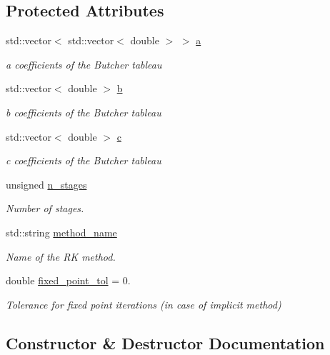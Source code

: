 \subsection*{Protected Attributes}
\begin{DoxyCompactItemize}
\item 
std\+::vector$<$ std\+::vector$<$ double $>$ $>$ \hyperlink{classRKSolver_ac5db53f1709b9db57f5ac9f41b54aa56}{a}
\begin{DoxyCompactList}\small\item\em a coefficients of the Butcher tableau \end{DoxyCompactList}\item 
std\+::vector$<$ double $>$ \hyperlink{classRKSolver_a205a66e4ac1d479de5d7e0677ae32783}{b}
\begin{DoxyCompactList}\small\item\em b coefficients of the Butcher tableau \end{DoxyCompactList}\item 
std\+::vector$<$ double $>$ \hyperlink{classRKSolver_af8ae228652ea669839fe260398057724}{c}
\begin{DoxyCompactList}\small\item\em c coefficients of the Butcher tableau \end{DoxyCompactList}\item 
unsigned \hyperlink{classRKSolver_adccead9bf0b1c26a25a073b05f25cc76}{n\+\_\+stages}
\begin{DoxyCompactList}\small\item\em Number of stages. \end{DoxyCompactList}\item 
std\+::string \hyperlink{classRKSolver_af0635d0dae01c89746b582796784794a}{method\+\_\+name}
\begin{DoxyCompactList}\small\item\em Name of the RK method. \end{DoxyCompactList}\item 
double \hyperlink{classRKSolver_aae528768265579a7c5b5cc5466114c82}{fixed\+\_\+point\+\_\+tol} = 0.
\begin{DoxyCompactList}\small\item\em Tolerance for fixed point iterations (in case of implicit method) \end{DoxyCompactList}\end{DoxyCompactItemize}


\subsection{Constructor \& Destructor Documentation}
\mbox{\label{classRKSolver_a47393b170acf8f25fb5110448ba4981b}} 
